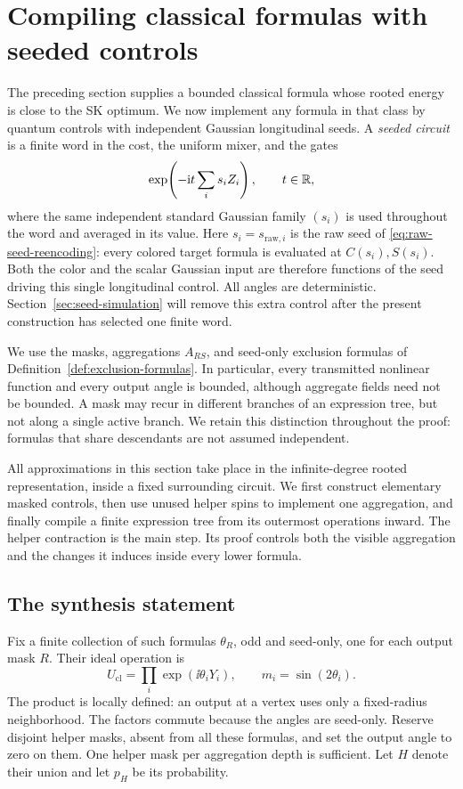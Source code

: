 \section{Compiling classical formulas with seeded controls}
\label{sec:classical-synthesis}

The preceding section supplies a bounded classical formula whose rooted
energy is close to the SK optimum.  We now implement any formula in that
class by quantum controls with independent Gaussian longitudinal seeds.
A \emph{seeded circuit} is a finite word in the cost, the uniform mixer,
and the gates
\[
 \exp\!\left(-\mathrm i t\sum_i s_iZ_i\right),\qquad t\in\mathbb R,
\]
where the same independent standard Gaussian family \((s_i)\) is used
throughout the word and averaged in its value.  Here
\(s_i=s_{\mathrm{raw},i}\) is the raw seed of
\eqref{eq:raw-seed-reencoding}: every colored target formula is evaluated
at \(C(s_i),S(s_i)\).  Both the color and the scalar Gaussian input
are therefore functions of the seed driving this single longitudinal
control.  All angles are deterministic.
Section~\ref{sec:seed-simulation} will remove this extra control after
the present construction has selected one finite word.

We use the masks, aggregations \(A_{RS}\), and seed-only exclusion
formulas of Definition~\ref{def:exclusion-formulas}.  In particular,
every transmitted nonlinear function and every output angle is bounded,
although aggregate fields need not be bounded.  A mask may recur in
different branches of an expression tree, but not along a single active
branch.  We retain this distinction throughout the proof: formulas that
share descendants are not assumed independent.

All approximations in this section take place in the infinite-degree
rooted representation, inside a fixed surrounding circuit.  We first
construct elementary masked controls, then use unused helper spins to
implement one aggregation, and finally compile a finite expression tree
from its outermost operations inward.  The helper contraction is the
main step.  Its proof controls both the visible aggregation and the
changes it induces inside every lower formula.

\subsection{The synthesis statement}

Fix a finite collection of such formulas \(\theta_R\), odd and
seed-only, one for each output mask \(R\).  Their ideal operation is
\begin{equation}
 U_{\mathrm{cl}}=\prod_i \exp(\ii\theta_iY_i),
 \qquad m_i=\sin(2\theta_i).
 \label{eq:ideal-classical-rotations}
\end{equation}
The product is locally defined: an output at a vertex uses only a
fixed-radius neighborhood.  The factors commute because the angles
are seed-only.  Reserve disjoint helper masks, absent from all these
formulas, and set the output angle to zero on them.  One helper mask
per aggregation depth is sufficient.  Let \(H\) denote their union
and let \(p_H\) be its probability.

